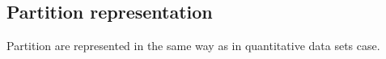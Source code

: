 \subsection{Partition representation}
Partition are represented in the same way as in quantitative data
sets case.
